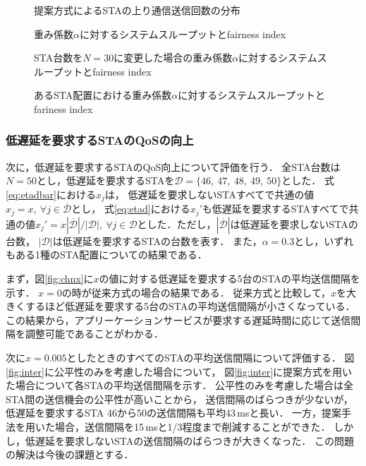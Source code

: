 \documentclass[master]{kuisthesis}		%
\begin{document}
			\begin{figure}[t]
				\centering
				\caption{提案方式によるSTAの上り通信送信回数の分布}
				\label{fig:fair}
			\end{figure}

			\begin{figure}[t]
				\centering
				\caption{重み係数$\alpha$に対するシステムスループットとfairness index}
				\label{fig:thr_fair}
			\end{figure}

			\begin{figure}[t]
				\centering
				\caption{STA台数を$N=30$に変更した場合の重み係数$\alpha$に対するシステムスループットとfairness index}
				\label{fig:chgnum}

				\caption{あるSTA配置における重み係数$\alpha$に対するシステムスループットとfariness index}
				\label{fig:chgtopology}
			\end{figure}

		\subsubsection{低遅延を要求するSTAのQoSの向上}
			次に，低遅延を要求するSTAのQoS向上について評価を行う．
			全STA台数は$N=50$とし，低遅延を要求するSTAを${\mathcal D}=\{46,\ 47,\ 48,\ 49,\ 50\}$とした．
			式\eqref{eq:etadbar}における$x_j$は，
			低遅延を要求しないSTAすべてで共通の値$x_j=x,\ \forall j\in {\overline {\mathcal D}}$とし，
			式\eqref{eq:etad}における$x_j'$も低遅延を要求するSTAすべてで共通の値$x_j'=x|{\overline {\mathcal D}}|/|{\mathcal D}|,\ \forall j \in {\mathcal D}$とした．ただし，$|{\overline {\mathcal D}}|$は低遅延を要求しないSTAの台数，
			$|{\mathcal D}|$は低遅延を要求するSTAの台数を表す．
			また，$\alpha=0.3$とし，いずれもある1種のSTA配置についての結果である．
			\par
			まず，図\ref{fig:chnx}に$x$の値に対する低遅延を要求する5台のSTAの平均送信間隔を示す．
			$x=0$の時が従来方式の場合の結果である．
			従来方式と比較して，$x$を大きくするほど低遅延を要求する5台のSTAの平均送信間隔が小さくなっている．
			この結果から，アプリーケーションサービスが要求する遅延時間に応じて送信間隔を調整可能であることがわかる．
			\par
			次に$x=0.005$としたときのすべてのSTAの平均送信間隔について評価する．
			図\ref{fig:inter}に公平性のみを考慮した場合について，
			図\ref{fig:inter}に提案方式を用いた場合について各STAの平均送信間隔を示す．
			公平性のみを考慮した場合は全STA間の送信機会の公平性が高いことから，
			送信間隔のばらつきが少ないが，低遅延を要求するSTA 46から50の送信間隔も平均43\,msと長い．
			一方，提案手法を用いた場合，送信間隔を15\,msと1/3程度まで削減することができた．
			しかし，低遅延を要求しないSTAの送信間隔のばらつきが大きくなった．
			この問題の解決は今後の課題とする．
\end{document}
